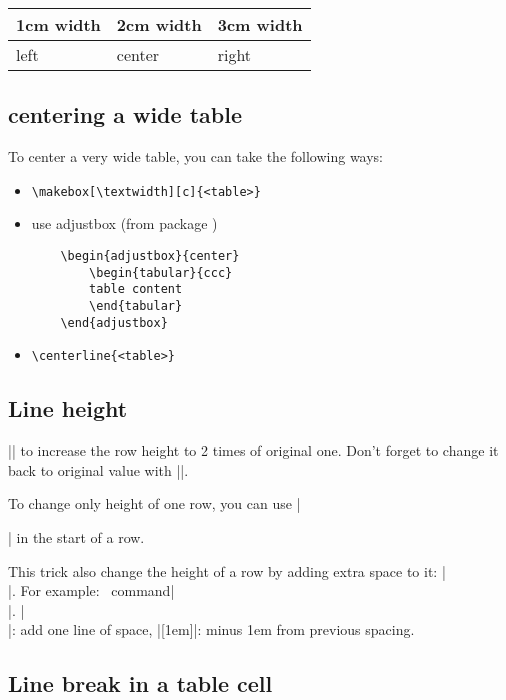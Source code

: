 \begin{tabular}{|L{1cm}|C{2cm}|R{3cm}|}
    \hline
    1cm width	& 2cm width & 3cm width	\\
    \hline
    left    & center	& right	\\
    \hline
\end{tabular}

\subsection{centering a wide table}
To center a very wide table, you can take the following ways:
\begin{itemize}
    \item \verb|\makebox[\textwidth][c]{<table>}|
    \item use adjustbox (from package )
	\begin{verbatim}
	\begin{adjustbox}{center}
	    \begin{tabular}{ccc}
		table content
	    \end{tabular}
	\end{adjustbox}
	\end{verbatim}
    \item \verb|\centerline{<table>}|
\end{itemize}



\subsection{Line height}
\command|\renewcommand{\arraystretch}{2}| to increase the row height to 
2 times of original one. Don't forget to change it back to original value
with \command|\renewcommand{\arraystretch}{1}|. 

To change only height of one row, you can use \command|\rule{0pt}{height} | in the start of a row. 

This trick also change the height of a row by adding extra space to it: 
\command|\\[distance]|. For example: |\\[-1em]|. \command|\\|: add one line of space, 
\command|[\-1em]|: minus 1em from previous spacing.

\subsection{Line break in a table cell}

